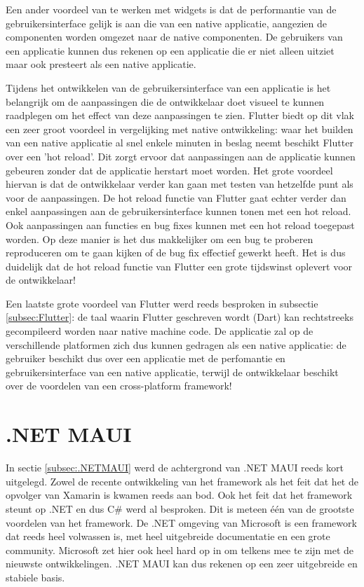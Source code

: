 Een ander voordeel van te werken met widgets is dat de performantie van de gebruikersinterface gelijk is aan die van een native applicatie, aangezien de componenten worden omgezet naar de native componenten. De gebruikers van een applicatie kunnen dus rekenen op een applicatie die er niet alleen uitziet maar ook presteert als een native applicatie.

Tijdens het ontwikkelen van de gebruikersinterface van een applicatie is het belangrijk om de aanpassingen die de ontwikkelaar doet visueel te kunnen raadplegen om het effect van deze aanpassingen te zien. Flutter biedt op dit vlak een zeer groot voordeel in vergelijking met native ontwikkeling: waar het builden van een native applicatie al snel enkele minuten in beslag neemt beschikt Flutter over een 'hot reload'. Dit zorgt ervoor dat aanpassingen aan de applicatie kunnen gebeuren zonder dat de applicatie herstart moet worden. Het grote voordeel hiervan is dat de ontwikkelaar verder kan gaan met testen van hetzelfde punt als voor de aanpassingen. De hot reload functie van Flutter gaat echter verder dan enkel aanpassingen aan de gebruikersinterface kunnen tonen met een hot reload. Ook aanpassingen aan functies en bug fixes kunnen met een hot reload toegepast worden. Op deze manier is het dus makkelijker om een bug te proberen reproduceren om te gaan kijken of de bug fix effectief gewerkt heeft. Het is dus duidelijk dat de hot reload functie van Flutter een grote tijdswinst oplevert voor de ontwikkelaar!

Een laatste grote voordeel van Flutter werd reeds besproken in subsectie \ref{subsec:Flutter}: de taal waarin Flutter geschreven wordt (Dart) kan rechtstreeks gecompileerd worden naar native machine code. De applicatie zal op de verschillende platformen zich dus kunnen gedragen als een native applicatie: de gebruiker beschikt dus over een applicatie met de perfomantie en gebruikersinterface van een native applicatie, terwijl de ontwikkelaar beschikt over de voordelen van een cross-platform framework!

\section{.NET MAUI}
\label{detailsdotnetMAUI}

In sectie \ref{subsec:.NETMAUI} werd de achtergrond van .NET MAUI reeds kort uitgelegd. Zowel de recente ontwikkeling van het framework als het feit dat het de opvolger van Xamarin is kwamen reeds aan bod. Ook het feit dat het framework steunt op .NET en dus C# werd al besproken. Dit is meteen één van de grootste voordelen van het framework. De .NET omgeving van Microsoft is een framework dat reeds heel volwassen is, met heel uitgebreide documentatie en een grote community. Microsoft zet hier ook heel hard op in om telkens mee te zijn met de nieuwste ontwikkelingen. .NET MAUI kan dus rekenen op een zeer uitgebreide en stabiele basis.

